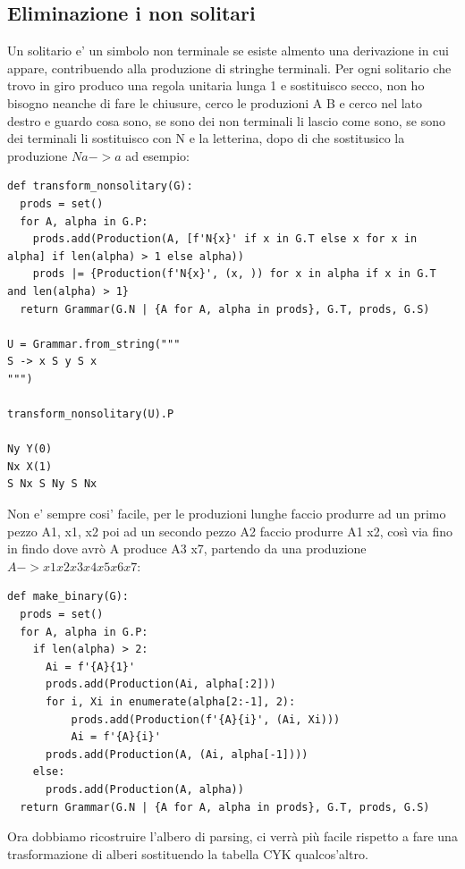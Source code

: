 \subsection{Eliminazione i non solitari}
Un solitario e' un simbolo non terminale se esiste almento una derivazione in cui appare, contribuendo alla produzione di stringhe terminali. 
Per ogni solitario che trovo in giro produco una regola unitaria lunga 1 e sostituisco secco, non ho bisogno neanche di fare le chiusure, cerco le produzioni A B e cerco nel lato destro e guardo cosa sono, se sono dei non terminali li lascio come sono, se sono dei terminali li sostituisco con N e la letterina, dopo di che sostitusico la produzione $Na -> a$ ad esempio:
\begin{lstlisting}
def transform_nonsolitary(G):
  prods = set()
  for A, alpha in G.P:
    prods.add(Production(A, [f'N{x}' if x in G.T else x for x in alpha] if len(alpha) > 1 else alpha))
    prods |= {Production(f'N{x}', (x, )) for x in alpha if x in G.T and len(alpha) > 1}
  return Grammar(G.N | {A for A, alpha in prods}, G.T, prods, G.S)

U = Grammar.from_string("""
S -> x S y S x
""")

transform_nonsolitary(U).P

Ny Y(0)
Nx X(1)
S Nx S Ny S Nx
\end{lstlisting}

Non e' sempre cosi' facile, per le produzioni lunghe faccio produrre ad un primo pezzo A1, x1, x2 poi ad un secondo pezzo A2 faccio produrre A1 x2, così via fino in findo dove avrò A produce A3 x7, partendo da una produzione $A -> x1 x2 x3 x4 x5 x6 x7$:
\begin{lstlisting}
def make_binary(G):
  prods = set()
  for A, alpha in G.P:
    if len(alpha) > 2:
      Ai = f'{A}{1}'
      prods.add(Production(Ai, alpha[:2]))
      for i, Xi in enumerate(alpha[2:-1], 2):
          prods.add(Production(f'{A}{i}', (Ai, Xi)))
          Ai = f'{A}{i}'
      prods.add(Production(A, (Ai, alpha[-1])))
    else:
      prods.add(Production(A, alpha))
  return Grammar(G.N | {A for A, alpha in prods}, G.T, prods, G.S)
\end{lstlisting} 

Ora dobbiamo ricostruire l'albero di parsing, ci verrà più facile rispetto a fare una trasformazione di alberi sostituendo la tabella CYK qualcos'altro.

